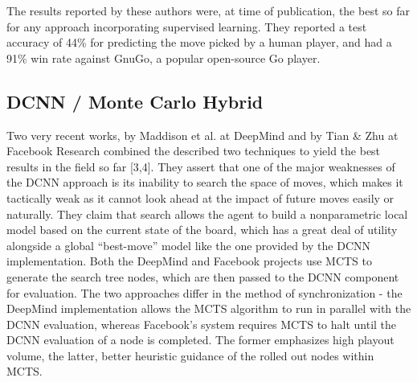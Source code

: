 The results reported by these authors were, at time of publication, the best so far for any approach incorporating supervised learning. They reported a test accuracy of 44\% for predicting the move picked by a human player, and had a 91\% win rate against GnuGo, a popular open-source Go player. 

\subsection*{DCNN / Monte Carlo Hybrid}

Two very recent works, by Maddison et al. at DeepMind and by Tian \& Zhu at Facebook Research combined the described two techniques to yield the best results in the field so far [3,4]. They assert that one of the major weaknesses of the DCNN approach is its inability to search the space of moves, which makes it tactically weak as it cannot look ahead at the impact of future moves easily or naturally. They claim that search allows the agent to build a nonparametric local model based on the current state of the board, which has a great deal of utility alongside a global ``best-move'' model like the one provided by the DCNN implementation. Both the DeepMind and Facebook projects use MCTS to generate the search tree nodes, which are then passed to the DCNN component for evaluation. The two approaches differ in the method of synchronization - the DeepMind implementation allows the MCTS algorithm to run in parallel with the DCNN evaluation, whereas Facebook's system requires MCTS to halt until the DCNN evaluation of a node is completed. The former emphasizes high playout volume, the latter, better heuristic guidance of the rolled out nodes within MCTS. 